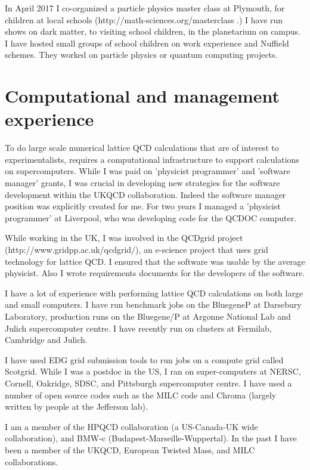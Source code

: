 \documentclass[12pt]{article}
\begin{document}
In April 2017 I co-organized a particle physics master 
class at Plymouth, for children at local schools  (http://math-sciences.org/masterclass .)
I have run shows on dark matter, to visiting school children,
in the planetarium on campus. I have hosted small groups
of school children on work experience and Nuffield 
schemes. They worked on particle physics or quantum computing
projects.


\section{Computational and management experience}

To do large scale numerical lattice QCD calculations that are of
interest to experimentalists, requires a computational infrastructure
to support calculations on supercomputers.  While I was paid on
'physicist programmer' and 'software manager' grants, I was crucial in
developing new strategies for the software development within the 
UKQCD collaboration.
Indeed the software manager position was explicitly created for me.
For two years I managed a 'physicist programmer' at Liverpool, who
was developing code for the QCDOC computer. 

While working in the UK, I was involved in the 
QCDgrid project (http://www.gridpp.ac.uk/qcdgrid/), 
an e-science project that
uses grid technology for lattice QCD.  I ensured that the software was
usable by the average physicist. Also I wrote requirements
documents for the developers of the software.

I have a lot of experience with performing lattice QCD calculations on
both large and small computers. 
I have run benchmark jobs on the 
BluegeneP at Darsebury Laboratory, production runs on
the Bluegene/P at Argonne National Lab and Julich supercomputer centre.
I have recently run on 
clusters at Fermilab, Cambridge and Julich.

I have
used EDG grid submission tools to run jobs on a compute grid
called Scotgrid.  While I was a postdoc in the US, I ran on
super-computers at NERSC, Cornell, Oakridge, SDSC, and Pittsburgh
supercomputer centre. I have used a number of open source codes such
as the MILC code and Chroma (largely written by people at the
Jefferson lab).

I am a member of the
HPQCD collaboration (a US-Canada-UK wide collaboration),
and BMW-c (Budapest-Marseille-Wuppertal).
In the past I have been a member of the UKQCD,
European Twisted Mass,
and MILC collaborations.
\end{document}
